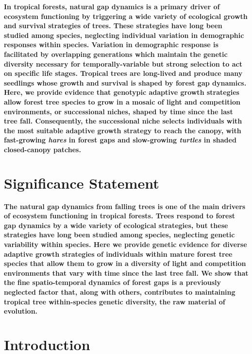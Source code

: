 \documentclass[
]{article}
\begin{document}
\textbf{In tropical forests, natural gap dynamics is a primary driver of ecosystem functioning by triggering a wide variety of ecological growth and survival strategies of trees. These strategies have long been studied among species, neglecting individual variation in demographic responses within species. Variation in demographic response is facilitated by overlapping generations which maintain the genetic diversity necessary for temporally-variable but strong selection to act on specific life stages. Tropical trees are long-lived and produce many seedlings whose growth and survival is shaped by forest gap dynamics. Here, we provide evidence that genotypic adaptive growth strategies allow forest tree species to grow in a mosaic of light and competition environments, or successional niches, shaped by time since the last tree fall. Consequently, the successional niche selects individuals with the most suitable adaptive growth strategy to reach the canopy, with fast-growing \emph{hares} in forest gaps and slow-growing \emph{turtles} in shaded closed-canopy patches.}

\hypertarget{significance-statement}{%
\section{Significance Statement}\label{significance-statement}}

\textbf{The natural gap dynamics from falling trees is one of the main drivers of ecosystem functioning in tropical forests. Trees respond to forest gap dynamics by a wide variety of ecological strategies, but these strategies have long been studied among species, neglecting genetic variability within species. Here we provide genetic evidence for diverse adaptive growth strategies of individuals within mature forest tree species that allow them to grow in a diversity of light and competition environments that vary with time since the last tree fall. We show that the fine spatio-temporal dynamics of forest gaps is a previously neglected factor that, along with others, contributes to maintaining tropical tree within-species genetic diversity, the raw material of evolution.}

\hypertarget{introduction}{%
\section{Introduction}\label{introduction}}
\end{document}
